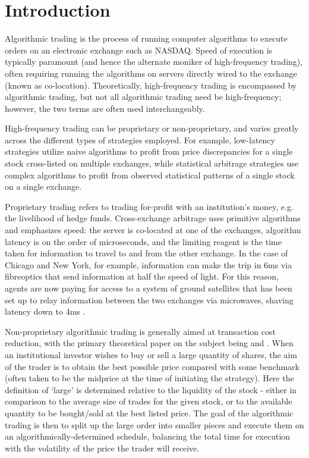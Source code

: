 \chapter{Introduction}

Algorithmic trading is the process of running computer algorithms to execute orders on an electronic exchange such as NASDAQ. Speed of execution is typically paramount (and hence the alternate moniker of high-frequency trading), often requiring running the algorithms on servers directly wired to the exchange (known as co-location). Theoretically, high-frequency trading is encompassed by algorithmic trading, but not all algorithmic trading need be high-frequency; however, the two terms are often used interchangeably. 

High-frequency trading can be proprietary or non-proprietary, and varies greatly across the different types of strategies employed. For example, low-latency strategies utilize naive algorithms to profit from price discrepancies for a single stock cross-listed on multiple exchanges, while statistical arbitrage strategies use complex algorithms to profit from observed statistical patterns of a single stock on a single exchange.

Proprietary trading refers to trading for-profit with an institution's money, e.g. the livelihood of hedge funds. Cross-exchange arbitrage uses primitive algorithms and emphasizes speed: the server is co-located at one of the exchanges, algorithm latency is on the order of microseconds, and the limiting reagent is the time taken for information to travel to and from the other exchange. In the case of Chicago and New York, for example, information can make the trip in 6ms via fibreoptics that send information at half the speed of light. For this reason, agents are now paying for access to a system of ground satellites that has been set up to relay information between the two exchanges via microwaves, shaving latency down to 4ms \citep{Laughlin14}.

Non-proprietary algorithmic trading is generally aimed at transaction cost reduction, with the primary theoretical paper on the subject being \citet{Bertsimas98} and \citet{Almgren01}. When an institutional investor wishes to buy or sell a large quantity of shares, the aim of the trader is to obtain the best possible price compared with some benchmark (often taken to be the midprice at the time of initiating the strategy). Here the definition of `large' is determined relative to the liquidity of the stock - either in comparison to the average size of trades for the given stock, or to the available quantity to be bought/sold at the best listed price. The goal of the algorithmic trading is then to split up the large order into smaller pieces and execute them on an algorithmically-determined schedule, balancing the total time for execution with the volatility of the price the trader will receive. 

